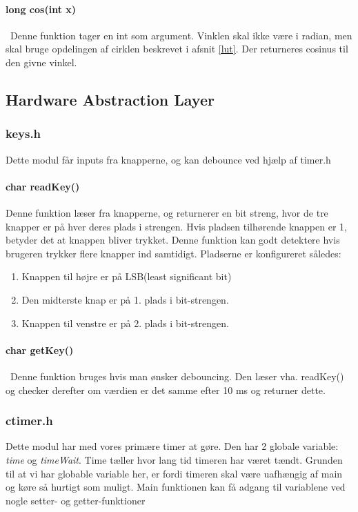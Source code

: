 \paragraph{long cos(int x)}\
Denne funktion tager en int som argument. Vinklen skal ikke være i radian, men skal bruge opdelingen af cirklen beskrevet i afsnit \ref{lut}. Der returneres cosinus til den givne vinkel.
\subsection{Hardware Abstraction Layer}
\subsubsection{keys.h}
Dette modul får inputs fra knapperne, og kan debounce ved hjælp af timer.h

\paragraph{char readKey()}
Denne funktion læser fra knapperne, og returnerer en bit streng, hvor de tre knapper er på hver deres plads i strengen. Hvis pladsen tilhørende knappen er 1, betyder det at knappen bliver trykket. Denne funktion kan godt detektere hvis brugeren trykker flere knapper ind samtidigt. Pladserne er konfigureret således:
\begin{enumerate}
\item Knappen til højre er på LSB(least significant bit)
\item Den midterste knap er på 1. plads i bit-strengen.
\item Knappen til venstre er på 2. plads i bit-strengen.
\end{enumerate}

\paragraph{char getKey()}\
Denne funktion bruges hvis man ønsker debouncing. Den læser vha. readKey() og checker derefter om værdien er det samme efter 10 ms og returner dette.
\subsubsection{ctimer.h}
Dette modul har med vores primære timer at gøre. Den har 2 globale variable: \textit{time} og \textit{timeWait}. Time tæller hvor lang tid timeren har været tændt. Grunden til at vi har globable variable her, er fordi timeren skal være uafhængig af main og køre så hurtigt som muligt. Main funktionen kan få adgang til variablene ved nogle setter- og getter-funktioner
